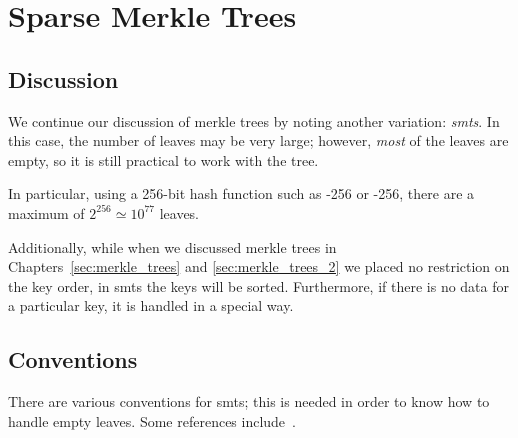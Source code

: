 



\section{Sparse Merkle Trees}
\label{sec:sparse_merkle_trees}

\subsection{Discussion}

We continue our discussion of \glspl{merkle tree} by noting
another variation: \emph{\glspl{smt}}.
In this case, the number of leaves may be very large;
however, \emph{most} of the leaves are empty,
so it is still practical to work with the tree.

In particular, using a 256-bit \gls{hash function} such as
\ShaTwo{}-256 or \ShaThree{}-256,
there are a maximum of $2^{256}\simeq 10^{77}$ leaves.

Additionally, while when we discussed \glspl{merkle tree} in
Chapters~\ref{sec:merkle_trees} and \ref{sec:merkle_trees_2}
we placed no restriction on the key order,
in \glspl{smt} the keys will be sorted.
Furthermore, if there is no data for a particular key,
it is handled in a special way.

\subsection{Conventions}

There are various conventions for \glspl{smt};
this is needed in order to know how to handle empty leaves.
Some references include~\cite{EfficientSMT,CompactSMT,CompactMerkleMultiproofs,
RevocationTransparency2012,AngelaSMT}.

